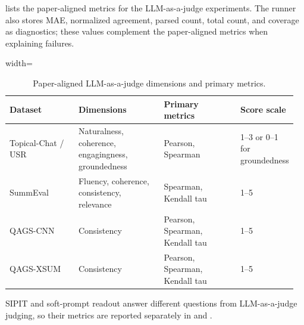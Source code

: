 \documentclass[12pt,a4paper,twoside,openright]{book}
\begin{document}
 lists the paper-aligned metrics for the
LLM-as-a-judge experiments. The runner also stores MAE, normalized agreement, parsed
count, total count, and coverage as diagnostics; these values complement the
paper-aligned metrics when explaining failures.

\begin{table}[!htb]
    \centering
    \scriptsize
    \begin{adjustbox}{width=\textwidth}
    \begin{tabular}{p{0.25\linewidth} p{0.31\linewidth} p{0.28\linewidth} p{0.12\linewidth}}
        \toprule
        \textbf{Dataset} & \textbf{Dimensions} & \textbf{Primary metrics} & \textbf{Score scale} \\
        \midrule
        Topical-Chat / USR &
        Naturalness, coherence, engagingness, groundedness &
        Pearson, Spearman &
        1--3 or 0--1 for groundedness \\
        SummEval &
        Fluency, coherence, consistency, relevance &
        Spearman, Kendall tau &
        1--5 \\
        QAGS-CNN &
        Consistency &
        Pearson, Spearman, Kendall tau &
        1--5 \\
        QAGS-XSUM &
        Consistency &
        Pearson, Spearman, Kendall tau &
        1--5 \\
        \bottomrule
    \end{tabular}
    \end{adjustbox}
    \caption{Paper-aligned LLM-as-a-judge dimensions and primary metrics.}
    \label{tab:geval-metrics}
\end{table}

SIPIT and soft-prompt readout answer different questions from LLM-as-a-judge
judging, so their metrics are reported separately in
 and .
\end{document}
